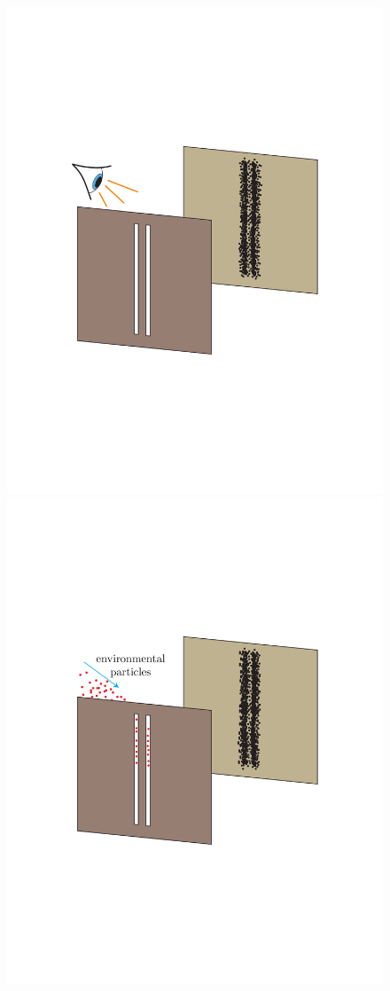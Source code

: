 \documentclass[3p,sort&compress,12pt]{elsarticle}
\begin{document}
\begin{figure}
\includegraphics[scale=.33]{dslook_new.pdf}\hspace{.7cm}
\includegraphics[scale=.33]{dslook_scatt.pdf}

\end{figure}
\end{document}
